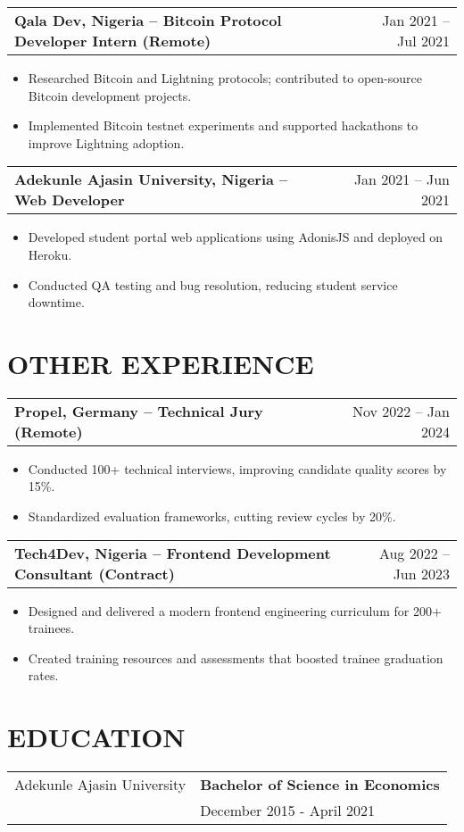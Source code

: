 \documentclass[a4paper,12pt]{article}
\makeatletter
\newenvironment{joblong}[2]
    {
    \begin{tabularx}{\linewidth}{@{}l X r@{}}
    \textbf{#1} & \hfill &  #2 \\[3.75pt]
    \end{tabularx}
    \begin{minipage}[t]{\linewidth}
    \begin{itemize}[nosep,after=\strut, leftmargin=1em, itemsep=3pt,label=--]
    }
    {
    \end{itemize}
    \end{minipage}    
    }
\makeatother
\begin{document}
\begin{joblong}{Qala Dev, Nigeria -- Bitcoin Protocol Developer Intern (Remote)}{Jan 2021 -- Jul 2021}
\item Researched Bitcoin and Lightning protocols; contributed to open-source Bitcoin development projects.
\item Implemented Bitcoin testnet experiments and supported hackathons to improve Lightning adoption.
\end{joblong}

\begin{joblong}{Adekunle Ajasin University, Nigeria -- Web Developer}{Jan 2021 -- Jun 2021}
\item Developed student portal web applications using AdonisJS and deployed on Heroku.
\item Conducted QA testing and bug resolution, reducing student service downtime.
\end{joblong}

\section{OTHER EXPERIENCE}

\begin{joblong}{Propel, Germany -- Technical Jury (Remote)}{Nov 2022 -- Jan 2024}
\item Conducted 100+ technical interviews, improving candidate quality scores by 15\%.
\item Standardized evaluation frameworks, cutting review cycles by 20\%.
\end{joblong}

\begin{joblong}{Tech4Dev, Nigeria -- Frontend Development Consultant (Contract)}{Aug 2022 -- Jun 2023}
\item Designed and delivered a modern frontend engineering curriculum for 200+ trainees.
\item Created training resources and assessments that boosted trainee graduation rates.
\end{joblong}


\section{EDUCATION}

\begin{tabularx}{\linewidth}{@{}l X@{}}
Adekunle Ajasin University & \textbf{Bachelor of Science in Economics} \\
                          & December 2015 - April 2021 \\[10pt]
\end{tabularx}
\end{document}

